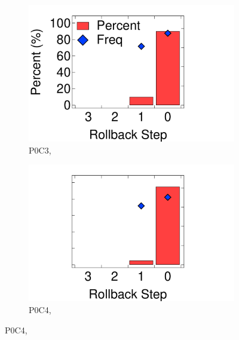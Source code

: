 \begin{figure}[t]
    \captionsetup[subfigure]{font=footnotesize}
    \begin{subfigure}{.180\linewidth}
        \includegraphics[trim=0 0 150 0,clip,width=\linewidth]{graphs/process/ubench-limit-dist/fp-limit-dist-p0c3.pdf}
        \setlength{\abovecaptionskip}{-9pt}
        \caption{P0C3, \\}
    \end{subfigure}
    \hfill
    \begin{subfigure}{.132\linewidth}
        \includegraphics[trim=130 0 150 0,clip,width=\linewidth]{graphs/process/ubench-limit-dist/fp-limit-dist-p0c4.pdf}
        \setlength{\abovecaptionskip}{-9pt}
        \caption{P0C4, \\}
    \end{subfigure}

\end{figure}
